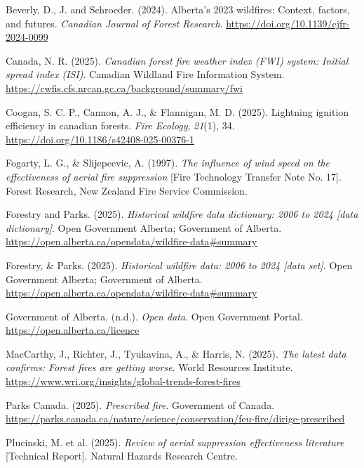 \documentclass[
]{article}
\newlength{\cslhangindent}
\newenvironment{CSLReferences}[2] %
 {\begin{list}{}{%
  \setlength{\itemindent}{0pt}
  \setlength{\leftmargin}{0pt}
  \setlength{\parsep}{0pt}
  \ifodd #1
   \setlength{\leftmargin}{\cslhangindent}
   \setlength{\itemindent}{-1\cslhangindent}
  \fi
  \setlength{\itemsep}{#2\baselineskip}}}
 {\end{list}}
\begin{document}
\label{refs}
\begin{CSLReferences}{1}{0}
Beverly, D., J. and Schroeder. (2024). Alberta's 2023 wildfires:
Context, factors, and futures. \emph{Canadian Journal of Forest
Research}. \url{https://doi.org/10.1139/cjfr-2024-0099}

Canada, N. R. (2025). \emph{Canadian forest fire weather index (FWI)
system: Initial spread index (ISI)}. Canadian Wildland Fire Information
System. \url{https://cwfis.cfs.nrcan.gc.ca/background/summary/fwi}

Coogan, S. C. P., Cannon, A. J., \& Flannigan, M. D. (2025). Lightning
ignition efficiency in canadian forests. \emph{Fire Ecology},
\emph{21}(1), 34. \url{https://doi.org/10.1186/s42408-025-00376-1}

Fogarty, L. G., \& Slijepcevic, A. (1997). \emph{The influence of wind
speed on the effectiveness of aerial fire suppression} {[}Fire
Technology Transfer Note No. 17{]}. Forest Research, New Zealand Fire
Service Commission.

Forestry and Parks. (2025). \emph{Historical wildfire data dictionary:
2006 to 2024 {[}data dictionary{]}}. Open Government Alberta; Government
of Alberta.
\url{https://open.alberta.ca/opendata/wildfire-data\#summary}

Forestry, \& Parks. (2025). \emph{Historical wildfire data: 2006 to 2024
{[}data set{]}}. Open Government Alberta; Government of Alberta.
\url{https://open.alberta.ca/opendata/wildfire-data\#summary}

Government of Alberta. (n.d.). \emph{Open data}. Open Government Portal.
\url{https://open.alberta.ca/licence}

MacCarthy, J., Richter, J., Tyukavina, A., \& Harris, N. (2025).
\emph{The latest data confirms: Forest fires are getting worse}. World
Resources Institute.
\url{https://www.wri.org/insights/global-trends-forest-fires}

Parks Canada. (2025). \emph{Prescribed fire}. Government of Canada.
\url{https://parks.canada.ca/nature/science/conservation/feu-fire/dirige-prescribed}

Plucinski, M. et al. (2025). \emph{Review of aerial suppression
effectiveness literature} {[}Technical Report{]}. Natural Hazards
Research Centre.


\end{CSLReferences}
\end{document}
